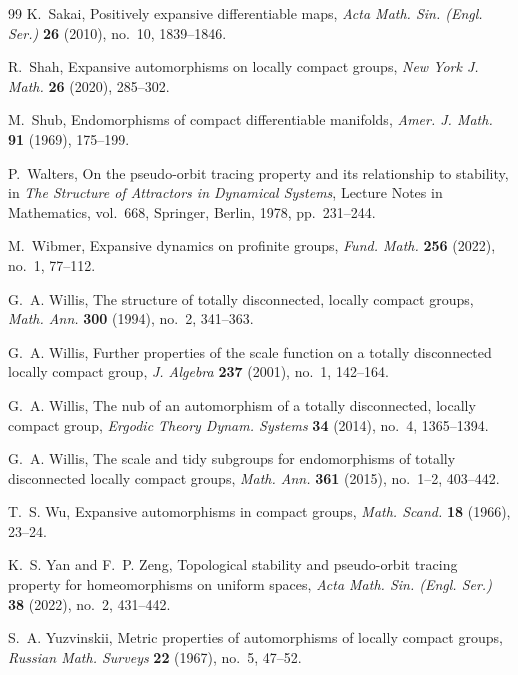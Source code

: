 \documentclass[12pt]{amsart}
\theoremstyle{definition}
\numberwithin{equation}{section}
\theoremstyle{remark}
\begin{document}
\begin{thebibliography}{99}
K.~Sakai,
Positively expansive differentiable maps,
\emph{Acta Math. Sin. (Engl. Ser.)} \textbf{26} (2010), no.~10,
1839--1846.

R.~Shah,
Expansive automorphisms on locally compact groups,
\emph{New York J. Math.} \textbf{26} (2020), 285--302.

M.~Shub,
Endomorphisms of compact differentiable manifolds,
\emph{Amer. J. Math.} \textbf{91} (1969), 175--199.

P.~Walters,
On the pseudo-orbit tracing property and its relationship to stability,
in \emph{The Structure of Attractors in Dynamical Systems},
Lecture Notes in Mathematics, vol.~668,
Springer, Berlin, 1978, pp.~231--244.

M.~Wibmer,
Expansive dynamics on profinite groups,
\emph{Fund. Math.} \textbf{256} (2022), no.~1, 77--112.

G.~A. Willis,
The structure of totally disconnected, locally compact groups,
\emph{Math. Ann.} \textbf{300} (1994), no.~2, 341--363.

G.~A. Willis,
Further properties of the scale function on a totally disconnected locally
compact group,
\emph{J. Algebra} \textbf{237} (2001), no.~1, 142--164.

G.~A. Willis,
The nub of an automorphism of a totally disconnected, locally compact group,
\emph{Ergodic Theory Dynam. Systems} \textbf{34} (2014), no.~4, 1365--1394.

G.~A. Willis,
The scale and tidy subgroups for endomorphisms of totally disconnected
locally compact groups,
\emph{Math. Ann.} \textbf{361} (2015), no.~1--2, 403--442.

T.~S. Wu,
Expansive automorphisms in compact groups,
\emph{Math. Scand.} \textbf{18} (1966), 23--24.

K.~S. Yan and F.~P. Zeng,
Topological stability and pseudo-orbit tracing property for homeomorphisms
on uniform spaces,
\emph{Acta Math. Sin. (Engl. Ser.)} \textbf{38} (2022), no.~2, 431--442.

S.~A. Yuzvinskii,
Metric properties of automorphisms of locally compact groups,
\emph{Russian Math. Surveys} \textbf{22} (1967), no.~5, 47--52.

\end{thebibliography}
	
\end{document}
